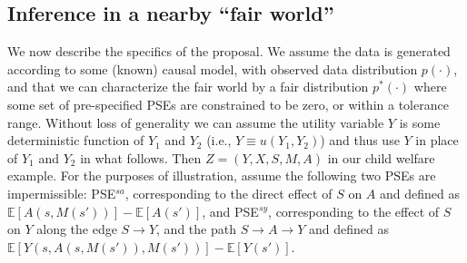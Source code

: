 \documentclass{article}
\newcommand{\E}{\mathbb{E}}
\begin{document}


\subsection{Inference in a nearby ``fair world''}

We now describe the specifics of the proposal.
We assume the data is generated according to some (known) causal model, with observed data distribution $p(\cdot)$, and that we can characterize the fair world by a fair distribution $p^*(\cdot)$ where some set of pre-specified PSEs are constrained to be zero, or within a tolerance range. 
Without loss of generality we can assume the utility variable $Y$ is some deterministic function of $Y_1$ and $Y_2$ (i.e., $Y \equiv u(Y_1,Y_2)$) and thus use $Y$ in place of $Y_1$ and $Y_2$ in what follows.
Then $Z = (Y,X,S,M,A)$ in our child welfare example. For the purposes of illustration, assume the following two PSEs are impermissible:
PSE$^{sa}$, corresponding to the direct effect of $S$ on $A$ and defined as $\E[A(s,M(s'))] - \E[A(s')]$, and
PSE$^{sy}$, corresponding to the effect of $S$ on $Y$ along the edge $S \to Y$, and the path $S \to A \to Y$ and defined as $\E[Y(s, A(s,M(s')), M(s'))] - \E[Y(s')]$.
\end{document}
